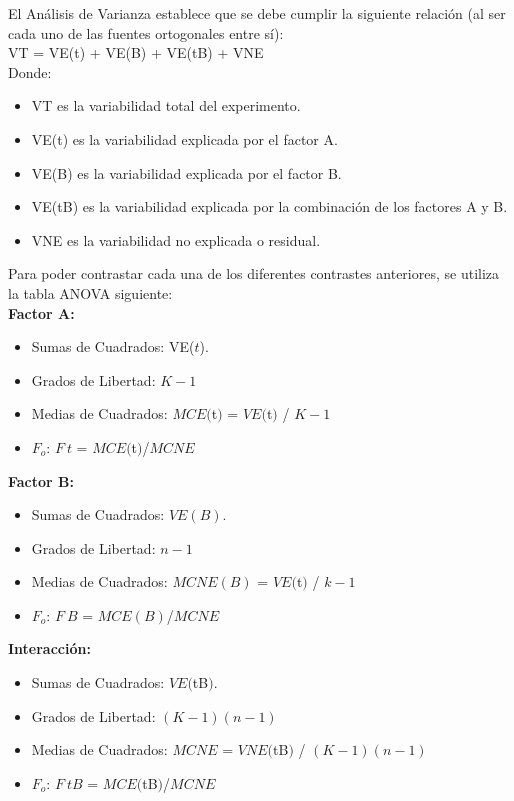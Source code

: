 \documentclass[12pt,letterpaper]{article}\usepackage[]{graphicx}\usepackage[]{color}
\begin{document}
El An\'alisis de Varianza establece que se debe cumplir la siguiente relaci\'on (al ser cada uno de las fuentes ortogonales entre s\'i):\\

VT = VE(t) + VE(B) + VE(tB) + VNE\\

Donde: 
\begin{itemize}
  \item VT es la variabilidad total del experimento.
  \item VE(t) es la variabilidad explicada por el factor A.
  \item VE(B) es la variabilidad explicada por el factor B. 
  \item VE(tB) es la variabilidad explicada por la combinaci\'on de los factores A y B. 
  \item VNE es la variabilidad no explicada o residual.
\end{itemize}

Para poder contrastar cada una de los diferentes contrastes anteriores, se utiliza la tabla ANOVA siguiente:\\

\textbf{Factor A:}
\begin{itemize}
  \item Sumas de Cuadrados: VE($t$).
  \item Grados de Libertad: $K-1$
  \item Medias de Cuadrados: $MCE($t$)$ = $VE($t$)$ / $K-1$ 
  \item $F_o$: $F_\ t$ = $MCE($t$)$/$MCNE$
\end{itemize}

\textbf{Factor B:}
\begin{itemize}
  \item Sumas de Cuadrados: $VE(B)$.
  \item Grados de Libertad: $n - 1$
  \item Medias de Cuadrados: $MCNE(B)$ = $VE($t$)$ / $k-1$
  \item $F_o$: $F_\ B$ = $MCE(B)$/$MCNE$
\end{itemize}

\textbf{Interacci\'on:}
\begin{itemize}
  \item Sumas de Cuadrados: $VE($tB$)$.
  \item Grados de Libertad: $(K - 1)(n - 1)$
  \item Medias de Cuadrados: $MCNE$ = $VNE($tB$)$ / $(K - 1)(n - 1)$
  \item $F_o$: $F_\ tB$ = $MCE($tB$)$/$MCNE$
\end{itemize}
\end{document}
